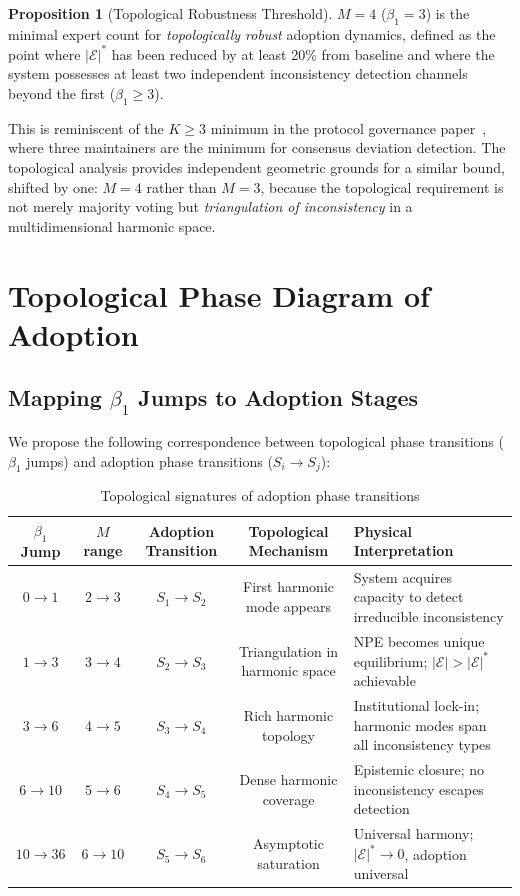 \documentclass[12pt,a4paper]{article}
\theoremstyle{definition}
\newtheorem{proposition}{Proposition}[section]
\theoremstyle{remark}
\theoremstyle{definition}
\newcommand{\CEC}{\mathcal{E}}
\newcommand{\CECstar}{|\CEC|^*}
\begin{document}
\begin{proposition}[Topological Robustness Threshold]\label{prop:M4_threshold}
  $M=4$ ($\beta_1=3$) is the minimal expert count for \emph{topologically robust} adoption dynamics, defined as the point where $\CECstar$ has been reduced by at least 20\% from baseline and where the system possesses at least two independent inconsistency detection channels beyond the first ($\beta_1 \geq 3$).
\end{proposition}

This is reminiscent of the $K \geq 3$ minimum in the protocol governance paper~\cite{protocol_governance}, where three maintainers are the minimum for consensus deviation detection. The topological analysis provides independent geometric grounds for a similar bound, shifted by one: $M=4$ rather than $M=3$, because the topological requirement is not merely majority voting but \emph{triangulation of inconsistency} in a multidimensional harmonic space.

\section{Topological Phase Diagram of Adoption}

\subsection{Mapping $\beta_1$ Jumps to Adoption Stages}

We propose the following correspondence between topological phase transitions ($\beta_1$ jumps) and adoption phase transitions ($S_i \to S_j$):

\begin{table}[H]
  \centering
  \caption{Topological signatures of adoption phase transitions}
  \label{tab:phase_mapping}
  \begin{tabular}{@{}c c c c p{4.5cm}@{}}
    \toprule
    $\beta_1$ Jump & $M$ range & Adoption Transition & Topological Mechanism & Physical Interpretation \\
    \midrule
    $0 \to 1$ & $2 \to 3$ & $S_1 \to S_2$ & First harmonic mode appears & System acquires capacity to detect irreducible inconsistency\\
    $1 \to 3$ & $3 \to 4$ & $S_2 \to S_3$ & Triangulation in harmonic space & NPE becomes unique equilibrium; $|\CEC| > \CECstar$ achievable\\
    $3 \to 6$ & $4 \to 5$ & $S_3 \to S_4$ & Rich harmonic topology & Institutional lock-in; harmonic modes span all inconsistency types\\
    $6 \to 10$ & $5 \to 6$ & $S_4 \to S_5$ & Dense harmonic coverage & Epistemic closure; no inconsistency escapes detection\\
    $10 \to 36$ & $6 \to 10$ & $S_5 \to S_6$ & Asymptotic saturation & Universal harmony; $\CECstar \to 0$, adoption universal\\
    \bottomrule
  \end{tabular}
\end{table}
\end{document}
